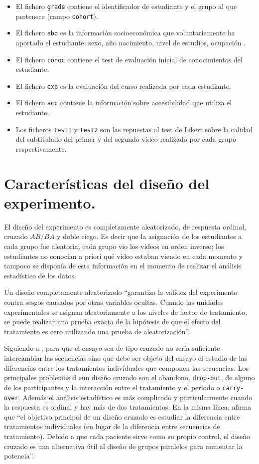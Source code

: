 \documentclass[
  12pt,
  a4paper,
  extrafontsizes,
  onecolumn,
  openright]{memoir}
\providecommand{\tightlist}{%
  \setlength{\itemsep}{0pt}\setlength{\parskip}{0pt}}\usepackage{longtable,booktabs,array}
\begin{document}
\begin{itemize}
\tightlist
\item
  El fichero \texttt{grade} contiene el identificador de estudiante y el
  grupo al que pertenece (campo \texttt{cohort}).
\item
  El fichero \texttt{abo} es la información socioeconómica que
  voluntariamente ha aportado el estudiante: sexo, año nacimiento, nivel
  de estudios, ocupación .
\item
  El fichero \texttt{conoc} contiene el test de evaluación inicial de
  conocimientos del estudiante.
\item
  El fichero \texttt{exp} es la evaluación del curso realizada por cada
  estudiante.
\item
  El fichero \texttt{acc} contiene la información sobre accesibilidad
  que utiliza el estudiante.
\item
  Los ficheros \texttt{test1} y \texttt{test2} son las repuestas al test
  de Likert sobre la calidad del subtitulado del primer y del segundo
  vídeo realizado por cada grupo respectivamente.
\end{itemize}

\hypertarget{sec-diseno}{%
\section{Características del diseño del experimento.}\label{sec-diseno}}

El diseño del experimento es completamente aleatorizado, de respuesta
ordinal, cruzado \(AB/BA\) y doble ciego. Es decir que la asignación de
los estudiantes a cada grupo fue aleatoria; cada grupo vio los vídeos en
orden inverso; los estudiantes no conocían a priori qué vídeo estaban
viendo en cada momento y tampoco se disponía de esta información en el
momento de realizar el análisis estadístico de los datos.

Un diseño completamente aleatorizado \autocite[pp.~18]{lawson2015}
\enquote{garantiza la validez del experimento contra sesgos causados por
otras variables ocultas. Cuando las unidades experimentales se asignan
aleatoriamente a los niveles de factor de tratamiento, se puede realizar
una prueba exacta de la hipótesis de que el efecto del tratamiento es
cero utilizando una prueba de aleatorización}.

Siguiendo a \textcite{senn2022}, para que el ensayo sea de tipo cruzado
no sería suficiente intercambiar las secuencias sino que debe ser objeto
del ensayo el estudio de las diferencias entre los tratamientos
individuales que componen las secuencias. Los principales problemas d
eun diseño cruzado son el abandono, \texttt{drop-out}, de alguno de los
participantes y la interacción entre el tratamiento y el periodo o
\texttt{carry-over}. Además el análisis estadístico es más complicado y
particularmente cuando la respuesta es ordinal y hay más de dos
tratamientos. En la misma línea, \textcite{lui2016} afirma que
\enquote{el objetivo principal de un diseño cruzado es estudiar la
diferencia entre tratamientos individuales (en lugar de la diferencia
entre secuencias de tratamiento). Debido a que cada paciente sirve como
su propio control, el diseño cruzado es una alternativa útil al diseño
de grupos paralelos para aumentar la potencia}.
\end{document}
